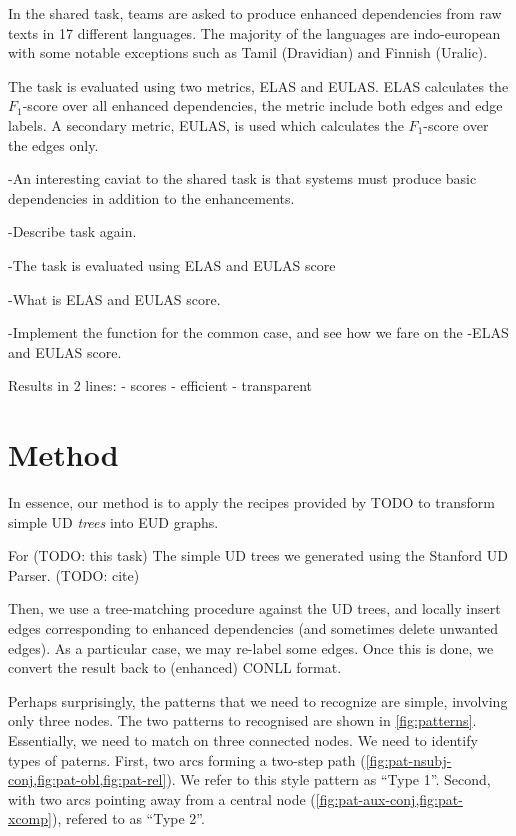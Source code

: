 \documentclass[11pt,a4paper]{article}
\begin{document}
In the shared task, teams are asked to produce enhanced
dependencies from raw texts in 17 different languages. The
majority of the languages are indo-european with some notable
exceptions such as Tamil (Dravidian) and Finnish (Uralic).

The task is evaluated using two metrics, ELAS and EULAS. ELAS
calculates the $F_1$-score over all enhanced dependencies, the
metric include both edges and edge labels. A secondary metric,
EULAS, is used which calculates the $F_1$-score over the edges
only.


    
-An interesting caviat to the shared task is that systems must produce basic dependencies in addition to the enhancements.  
    
-Describe task again.

-The task is evaluated using ELAS and EULAS score

    
-What is ELAS and EULAS  score.

-Implement the function for the common case, and see how we fare on the
-ELAS and EULAS  score.

Results in 2 lines:
- scores
- efficient
- transparent

\section{Method}


In essence, our method is to apply the recipes provided by TODO to
transform simple UD \emph{trees} into EUD graphs.

For (TODO: this task) The simple UD trees we generated using the
Stanford UD Parser. (TODO: cite)

Then, we use a tree-matching procedure against the UD trees, and
locally insert edges corresponding to enhanced dependencies (and
sometimes delete unwanted edges). As a particular case, we may
re-label some edges. Once this is done, we convert the result back to
(enhanced) CONLL  format.

Perhaps surprisingly, the patterns that we need to recognize are
simple, involving only three nodes. The two patterns to recognised are
shown in \cref{fig:patterns}. Essentially, we need to match on three
connected nodes.  We need to identify types of paterns. First, two
arcs forming a two-step path
(\cref{fig:pat-nsubj-conj,fig:pat-obl,fig:pat-rel}). We refer to this
style pattern as ``Type 1''.  Second, with two arcs pointing away from
a central node (\cref{fig:pat-aux-conj,fig:pat-xcomp}), refered to as
``Type 2''.
\end{document}
